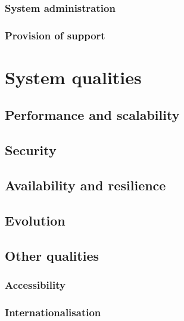 \documentclass[a4paper,11pt]{report}
\begin{document}
\subsection{System administration}
\label{sec:syst-admin}


\subsection{Provision of support}
\label{sec:provision-support}


\chapter{System qualities}
\label{cha:system-qualities}
\thispagestyle{fancy}


\section{Performance and scalability}
\label{sec:perf-scal}


\section{Security}
\label{sec:security}



\section{Availability and resilience}
\label{sec:avail-resil}



\section{Evolution}
\label{sec:evolution}


\section{Other qualities}
\label{sec:other-qualities}

\subsection{Accessibility}
\label{sec:accessibility}


\subsection{Internationalisation}
\label{sec:internationalisation}
\end{document}
